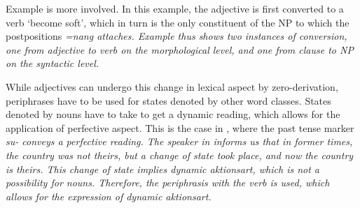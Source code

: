 
Example  is more involved. In this example, the adjective  is first converted to a verb `become soft', which in turn is the only constituent of the NP to which the postpositions \em =nang \em attaches. Example  thus shows two instances of conversion, one from adjective to verb on the morphological level, and one from clause to NP on the syntactic level.




While adjectives can undergo this change in lexical aspect by zero-derivation, periphrases have to be used for states denoted by other word classes. States denoted by nouns have to take  to get a dynamic reading, which allows for the application of perfective aspect. This is the case  in , where the past tense marker \em su- \em conveys a perfective reading. The speaker in  informs us that in former times, the country was not theirs, but a change of state took place, and now the country is theirs. This change of state implies dynamic aktionsart, which is not a possibility for nouns. Therefore, the periphrasis with the verb  is used, which allows for the expression of dynamic aktionsart.



